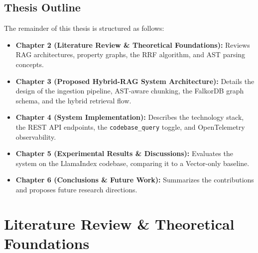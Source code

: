 \documentclass[12pt,a4paper,oneside]{report}
\begin{document}
\section{Thesis Outline}
The remainder of this thesis is structured as follows:
\begin{itemize}
    \item \textbf{Chapter 2 (Literature Review \& Theoretical Foundations):} Reviews RAG architectures, property graphs, the RRF algorithm, and AST parsing concepts.
    \item \textbf{Chapter 3 (Proposed Hybrid-RAG System Architecture):} Details the design of the ingestion pipeline, AST-aware chunking, the FalkorDB graph schema, and the hybrid retrieval flow.
    \item \textbf{Chapter 4 (System Implementation):} Describes the technology stack, the REST API endpoints, the \texttt{codebase\_query} toggle, and OpenTelemetry observability.
    \item \textbf{Chapter 5 (Experimental Results \& Discussions):} Evaluates the system on the LlamaIndex codebase, comparing it to a Vector-only baseline.
    \item \textbf{Chapter 6 (Conclusions \& Future Work):} Summarizes the contributions and proposes future research directions.
\end{itemize}

\newpage

\chapter{Literature Review \& Theoretical Foundations}
\end{document}
